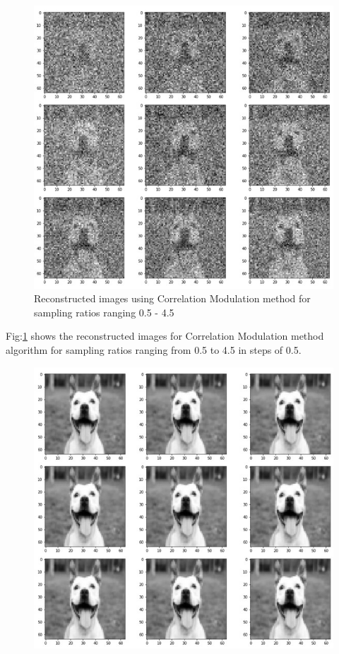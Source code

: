 \documentclass[conference]{IEEEtran}
\begin{document}
\begin{itemize}
    \begin{figure}[ht]
        \centering
        \includegraphics[scale=0.65]{figures/cm_sampling_ratio.jpg}
        \caption{Reconstructed images using Correlation Modulation method for sampling ratios ranging 0.5 - 4.5}
        \label{fig:cm_sampling_ratio}
        \end{figure}
    \par Fig:\ref{fig:cm_sampling_ratio} shows the reconstructed images for Correlation Modulation method algorithm for sampling ratios ranging from 0.5 to 4.5 in steps of 0.5.
    \bigskip
    \bigskip
    \bigskip
    \bigskip
    \bigskip
    \begin{figure}[ht]
        \centering
        \includegraphics[scale=0.65]{figures/basisScan_sampling_ratio.jpg}

\end{figure}
\end{itemize}
\end{document}
